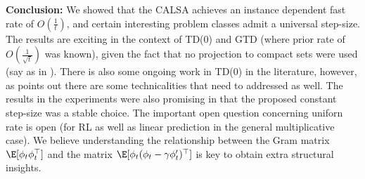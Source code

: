 \textbf{Conclusion:} We showed that the CALSA achieves an instance dependent fast rate of $O(\frac{1}{t})$, and certain interesting problem classes admit a universal step-size. The results are exciting in the context of TD(0) and GTD (where prior rate of $O(\frac{1}{\sqrt{t}})$ was known), given the fact that no projection to compact sets were used (say as in \cite{gtdmp}). There is also some ongoing work in TD(0) in the literature, however, as \cite{issues}  points out there are some technicalities that need to addressed as well. The results in the experiments were also promising in that the proposed constant step-size was a stable choice. The important open question concerning uniforn rate is open (for RL as well as linear prediction in the general multiplicative case). We believe understanding the relationship between the Gram matrix $\E[\phi_t\phi_t^\top]$ and the matrix $\E[\phi_t(\phi_t-\gamma{\phi'_t})^\top]$ is  key to obtain extra structural insights.